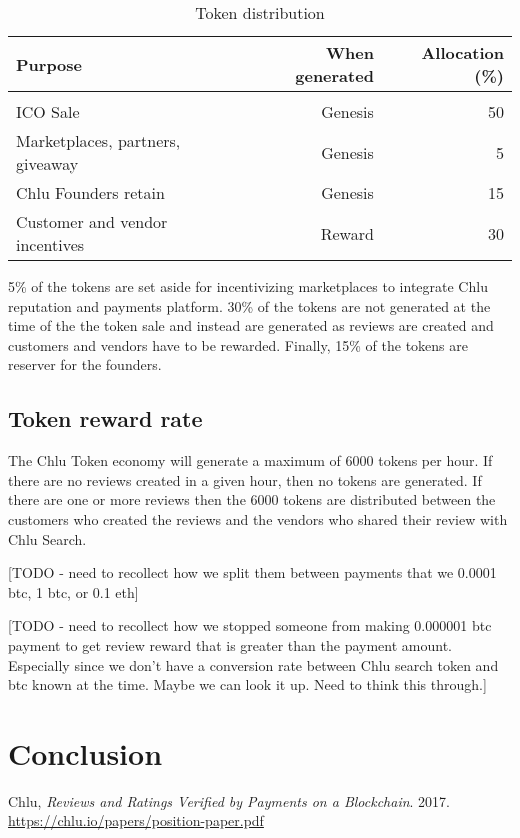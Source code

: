 \documentclass[a4paper]{article}
\begin{document}
\begin{center}
  \begin{table}
    \begin{tabular}{l r r}
      \textbf{Purpose} & \textbf{When generated} & \textbf{Allocation (\%)} \\
      \hline \\
      ICO Sale & Genesis & 50 \\
      Marketplaces, partners, giveaway  & Genesis & 5 \\
      Chlu Founders retain & Genesis & 15 \\
      Customer and vendor incentives & Reward & 30
    \end{tabular}
    \caption{Token distribution}
  \end{table}
\end{center}

5\% of the tokens are set aside for incentivizing marketplaces to
integrate Chlu reputation and payments platform. 30\% of the tokens
are not generated at the time of the the token sale and instead are
generated as reviews are created and customers and vendors have to be
rewarded. Finally, 15\% of the tokens are reserver for the founders.

\subsection{Token reward rate}

The Chlu Token economy will generate a maximum of 6000 tokens per
hour. If there are no reviews created in a given hour, then no tokens
are generated. If there are one or more reviews then the 6000 tokens
are distributed between the customers who created the reviews and the
vendors who shared their review with Chlu Search.

[TODO - need to recollect how we split them between payments that we
  0.0001 btc, 1 btc, or 0.1 eth]

[TODO - need to recollect how we stopped someone from making 0.000001
  btc payment to get review reward that is greater than the payment
  amount. Especially since we don't have a conversion rate between
  Chlu search token and btc known at the time. Maybe we can look it
  up. Need to think this through.]

\section{Conclusion}


\medskip
 
\begin{thebibliography}{9}

 Chlu, \textit{Reviews and Ratings Verified
  by Payments on a Blockchain}. 2017.
  \url{https://chlu.io/papers/position-paper.pdf}
  
\end{thebibliography}
\end{document}
